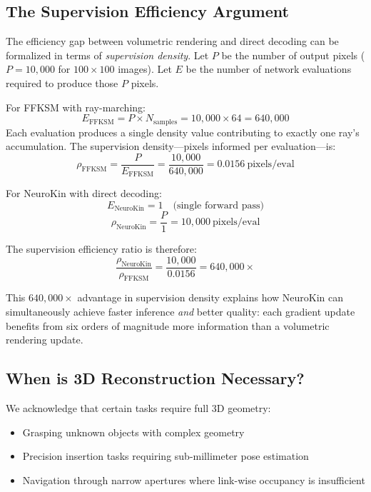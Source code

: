 \documentclass[12pt,a4paper,oneside]{report}
\begin{document}
\subsection{The Supervision Efficiency Argument}

The efficiency gap between volumetric rendering and direct decoding can be formalized in terms of \textit{supervision density}. Let $P$ be the number of output pixels ($P = 10,000$ for $100 \times 100$ images). Let $E$ be the number of network evaluations required to produce those $P$ pixels.

For FFKSM with ray-marching:
\begin{equation}
E_{\text{FFKSM}} = P \times N_{\text{samples}} = 10,000 \times 64 = 640,000
\end{equation}
Each evaluation produces a single density value contributing to exactly one ray's accumulation. The supervision density---pixels informed per evaluation---is:
\begin{equation}
\rho_{\text{FFKSM}} = \frac{P}{E_{\text{FFKSM}}} = \frac{10,000}{640,000} = 0.0156\ \text{pixels/eval}
\end{equation}

For NeuroKin with direct decoding:
\begin{equation}
E_{\text{NeuroKin}} = 1 \quad \text{(single forward pass)}
\end{equation}
\begin{equation}
\rho_{\text{NeuroKin}} = \frac{P}{1} = 10,000\ \text{pixels/eval}
\end{equation}

The supervision efficiency ratio is therefore:
\begin{equation}
\frac{\rho_{\text{NeuroKin}}}{\rho_{\text{FFKSM}}} = \frac{10,000}{0.0156} = 640,000\times
\end{equation}

This $640,000\times$ advantage in supervision density explains how NeuroKin can simultaneously achieve faster inference \textit{and} better quality: each gradient update benefits from six orders of magnitude more information than a volumetric rendering update.

\subsection{When is 3D Reconstruction Necessary?}

We acknowledge that certain tasks require full 3D geometry:
\begin{itemize}
    \item Grasping unknown objects with complex geometry
    \item Precision insertion tasks requiring sub-millimeter pose estimation
    \item Navigation through narrow apertures where link-wise occupancy is insufficient
\end{itemize}
\end{document}
